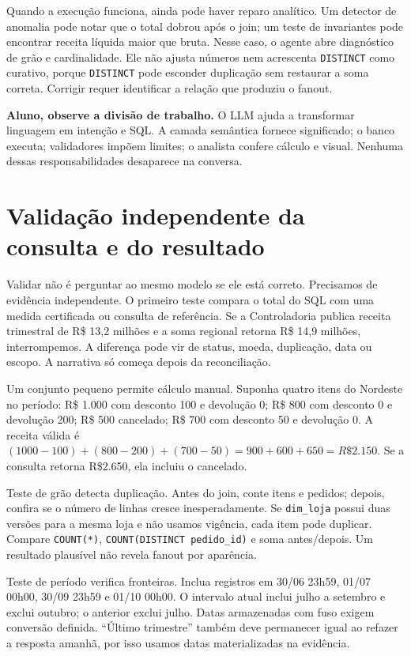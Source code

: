 Quando a execução funciona, ainda pode haver reparo analítico. Um detector de anomalia pode notar que o total dobrou após o join; um teste de invariantes pode encontrar receita líquida maior que bruta. Nesse caso, o agente abre diagnóstico de grão e cardinalidade. Ele não ajusta números nem acrescenta \texttt{DISTINCT} como curativo, porque \texttt{DISTINCT} pode esconder duplicação sem restaurar a soma correta. Corrigir requer identificar a relação que produziu o fanout.

\begin{GuidedBox}
\textbf{Aluno, observe a divisão de trabalho.} O LLM ajuda a transformar linguagem em intenção e SQL. A camada semântica fornece significado; o banco executa; validadores impõem limites; o analista confere cálculo e visual. Nenhuma dessas responsabilidades desaparece na conversa.
\end{GuidedBox}

\section{Validação independente da consulta e do resultado}

Validar não é perguntar ao mesmo modelo se ele está correto. Precisamos de evidência independente. O primeiro teste compara o total do SQL com uma medida certificada ou consulta de referência. Se a Controladoria publica receita trimestral de R\$ 13,2 milhões e a soma regional retorna R\$ 14,9 milhões, interrompemos. A diferença pode vir de status, moeda, duplicação, data ou escopo. A narrativa só começa depois da reconciliação.

Um conjunto pequeno permite cálculo manual. Suponha quatro itens do Nordeste no período: R\$ 1.000 com desconto 100 e devolução 0; R\$ 800 com desconto 0 e devolução 200; R\$ 500 cancelado; R\$ 700 com desconto 50 e devolução 0. A receita válida é $(1000-100)+(800-200)+(700-50)=900+600+650=R\$2.150$. Se a consulta retorna R\$2.650, ela incluiu o cancelado.

Teste de grão detecta duplicação. Antes do join, conte itens e pedidos; depois, confira se o número de linhas cresce inesperadamente. Se \texttt{dim\_loja} possui duas versões para a mesma loja e não usamos vigência, cada item pode duplicar. Compare \texttt{COUNT(*)}, \texttt{COUNT(DISTINCT pedido\_id)} e soma antes/depois. Um resultado plausível não revela fanout por aparência.

Teste de período verifica fronteiras. Inclua registros em 30/06 23h59, 01/07 00h00, 30/09 23h59 e 01/10 00h00. O intervalo atual inclui julho a setembro e exclui outubro; o anterior exclui julho. Datas armazenadas com fuso exigem conversão definida. ``Último trimestre'' também deve permanecer igual ao refazer a resposta amanhã, por isso usamos datas materializadas na evidência.

